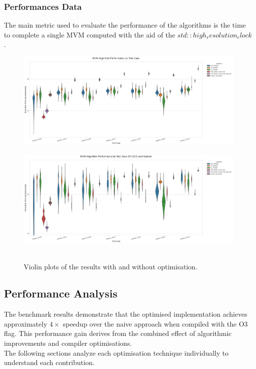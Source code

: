 \subsubsection{Performances Data}\label{sec:Data_Perf}
The main metric used to evaluate the performance of the algorithms is the time to complete a single MVM computed with the aid of the $std::high_resolution_clock$.
\begin{figure}[!htb]
\begin{minipage}{1\textwidth}
    {\includegraphics[width=\textwidth]{Figures/mvm_benchmark_violin_plot (1).png}
    \label{fig:no_opt_plot}}
\end{minipage}
\hfill
\begin{minipage}{1\textwidth}
    {\includegraphics[width=\textwidth]{Figures/mvm_benchmark_violin_plot_opt.png}
    \label{fig:opt_plot}}
\end{minipage}
\caption{\\ Violin plots of the results with and without optimisation. \label{fig:plots}}
\end{figure}




\subsection{Performance Analysis}\label{sec:data_anal}
The benchmark results demonstrate that the optimised implementation achieves approximately $4\times$ speedup over the naive approach when compiled with the O3 flag. 
This performance gain derives from the combined effect of algorithmic improvements and compiler optimisations.\\
The following sections analyze each optimisation technique individually to understand each contribution.

